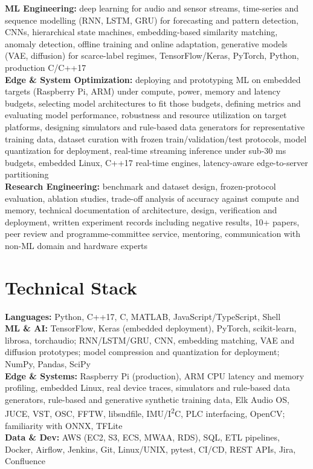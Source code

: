\documentclass[11pt]{article}
\begin{document}
\textbf{ML Engineering:} deep learning for audio and sensor streams, time-series and sequence modelling (RNN, LSTM, GRU) for forecasting and pattern detection, CNNs, hierarchical state machines, embedding-based similarity matching, anomaly detection, offline training and online adaptation, generative models (VAE, diffusion) for scarce-label regimes, TensorFlow/Keras, PyTorch, Python, production C/C++17\\
\textbf{Edge \& System Optimization:} deploying and prototyping ML on embedded targets (Raspberry Pi, ARM) under compute, power, memory and latency budgets, selecting model architectures to fit those budgets, defining metrics and evaluating model performance, robustness and resource utilization on target platforms, designing simulators and rule-based data generators for representative training data, dataset curation with frozen train/validation/test protocols, model quantization for deployment, real-time streaming inference under sub-30 ms budgets, embedded Linux, C++17 real-time engines, latency-aware edge-to-server partitioning\\
\textbf{Research Engineering:} benchmark and dataset design, frozen-protocol evaluation, ablation studies, trade-off analysis of accuracy against compute and memory, technical documentation of architecture, design, verification and deployment, written experiment records including negative results, 10+ papers, peer review and programme-committee service, mentoring, communication with non-ML domain and hardware experts

\section*{Technical Stack}

\textbf{Languages:} Python, C++17, C, MATLAB, JavaScript/TypeScript, Shell\\
\textbf{ML \& AI:} TensorFlow, Keras (embedded deployment), PyTorch, scikit-learn, librosa, torchaudio; RNN/LSTM/GRU, CNN, embedding matching, VAE and diffusion prototypes; model compression and quantization for deployment; NumPy, Pandas, SciPy\\
\textbf{Edge \& Systems:} Raspberry Pi (production), ARM CPU latency and memory profiling, embedded Linux, real device traces, simulators and rule-based data generators, rule-based and generative synthetic training data, Elk Audio OS, JUCE, VST, OSC, FFTW, libsndfile, IMU/I\textsuperscript{2}C, PLC interfacing, OpenCV; familiarity with ONNX, TFLite\\
\textbf{Data \& Dev:} AWS (EC2, S3, ECS, MWAA, RDS), SQL, ETL pipelines, Docker, Airflow, Jenkins, Git, Linux/UNIX, pytest, CI/CD, REST APIs, Jira, Confluence
\end{document}
